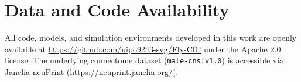 \documentclass{article}
\begin{document}
\section*{Data and Code Availability}
All code, models, and simulation environments developed in this work are openly available at \url{https://github.com/uipo9243-svg/Fly-CfC} under the Apache 2.0 license. The underlying connectome dataset (\texttt{male-cns:v1.0}) is accessible via Janelia neuPrint (\url{https://neuprint.janelia.org/}).



\end{document}
